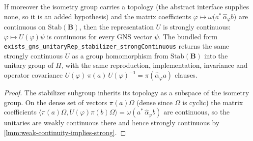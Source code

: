 \begin{theorem}
    \label{thrm:gns-unitary-stabilizer-strongly-continuous-in-curved-spacetime}
    \leanok
    If moreover the isometry group carries a topology (the abstract interface supplies none, so it is an added hypothesis) and the matrix coefficients $\varphi \mapsto \omega\big(a^*\,\hat\alpha_\varphi b\big)$ are continuous on $\mathrm{Stab}(\mathbf{B})$, then the representation $U$ is strongly continuous: $\varphi \mapsto U(\varphi)\psi$ is continuous for every GNS vector $\psi$. The bundled form \texttt{exists\_gns\_unitaryRep\_stabilizer\_strongContinuous} returns the same strongly continuous $U$ as a group homomorphism from $\mathrm{Stab}(\mathbf{B})$ into the unitary group of $H$, with the same reproduction, implementation, invariance and operator covariance $U(\varphi)\,\pi(a)\,U(\varphi)^{-1} = \pi(\hat\alpha_\varphi a)$ clauses.
\end{theorem}
\begin{proof}
    \leanok
    The stabilizer subgroup inherits its topology as a subspace of the isometry group. On the dense set of vectors $\pi(a)\Omega$ (dense since $\Omega$ is cyclic) the matrix coefficients $\langle \pi(a)\Omega, U(\varphi)\pi(b)\Omega\rangle = \omega(a^*\,\hat\alpha_\varphi b)$ are continuous, so the unitaries are weakly continuous there and hence strongly continuous by \ref{lmm:weak-continuity-implies-strong}.
\end{proof}

